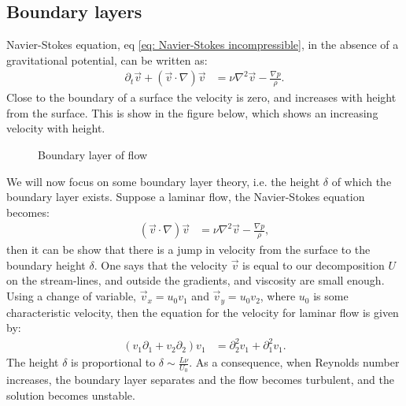 \documentclass[a4paper]{article}
\begin{document}
\subsection{Boundary layers}
Navier-Stokes equation, eq \eqref{eq: Navier-Stokes incompressible}, in the absence of a gravitational potential, can be written as:
\begin{align*}
    \partial_t\vec{v} + \left(\vec{v}\cdot\nabla\right)\vec{v} &= \nu\nabla^2\vec{v} -\frac{\nabla p}{\rho}.
\end{align*}Close to the boundary of a surface the velocity is zero, and increases with height from the surface. This is show in the figure below, which shows an increasing velocity with height.

\begin{figure}[H]
    \centering
    \caption{Boundary layer of flow}
    \label{fig: Boundary layer}
\end{figure}\noindent
We will now focus on some boundary layer theory, i.e. the height $\delta$ of which the boundary layer exists. Suppose a laminar flow, the Navier-Stokes equation becomes:
\begin{align*}
    \left(\vec{v}\cdot\nabla\right)\vec{v} &= \nu\nabla^2\vec{v} - \frac{\nabla p}{\rho},
\end{align*}then it can be show that there is a jump in velocity from the surface to the boundary height $\delta$. One says that the velocity $\vec{v}$ is equal to our decomposition $U$ on the stream-lines, and outside the gradients, and viscosity are small enough.
Using a change of variable, $\vec{v}_x = u_0v_1$ and $\vec{v}_y = u_0v_2$, where $u_0$ is some characteristic velocity, then the equation for the velocity for laminar flow is given by:
\begin{align}
    \left(v_1\partial_1 + v_2\partial_2\right)v_1 &= \partial_2^2v_1 + \partial_1^2v_1.\label{eq: laminar flow velocity}
\end{align}The height $\delta$ is proportional to $\delta \sim \frac{L\nu}{U_0}$. As a consequence, when Reynolds number increases, the boundary layer separates and the flow becomes turbulent, and the solution becomes unstable.
\end{document}

